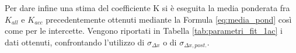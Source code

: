 \documentclass[a4paper,11pt,oneside]{article}
\begin{document}
Per dare infine una stima del coefficiente K si è eseguita la media ponderata fra $K_{all}$ e $K_{acc}$ precedentemente ottenuti mediante la Formula \ref{eq:media_pond} così come per le intercette. Vengono riportati in Tabella \ref{tab:parametri_fit_1ac} i dati ottenuti, confrontando l'utilizzo di $\sigma_{\Delta x}$ o di $\sigma_{\Delta x, post.}$.

\begin{table}[h!]
    \centering
    \caption{Stime dei parametri del fit per il decimo estensimetro}
    \label{tab:parametri_fit_1ac}
\end{table}
\end{document}
